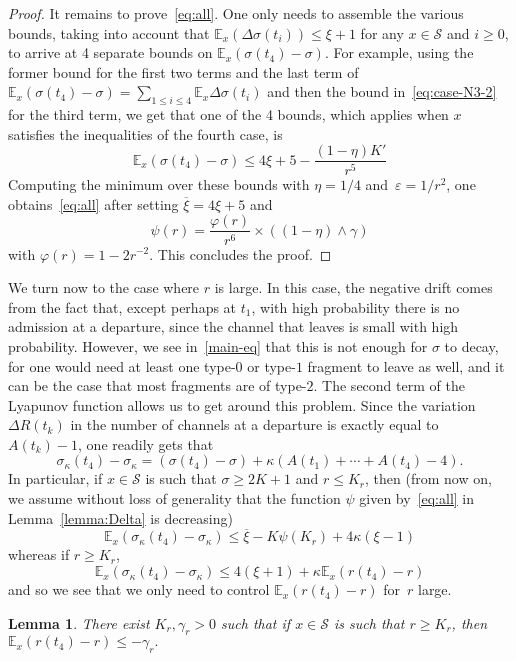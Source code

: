 \documentclass{amsart}
\def\E{\mathbb{E}}
\def\Scal{\mathcal{S}}
\newtheorem{lemma}{Lemma}
\begin{document}
\begin{proof}
It remains to prove~\eqref{eq:all}. One only needs to assemble the
various bounds, taking into account  that $\E_x(\Delta
\sigma (t_i)) \leq \xi + 1$ for any $x \in \Scal$ and $i \geq 0$, to
arrive at 4 separate bounds on $\E_x(\sigma(t_4)-\sigma)$.  For
example, using the former bound for the first two terms and the last
term of
$\E_x(\sigma(t_4)-\sigma) = \sum_{1 \leq i \leq 4} \E_x \Delta \sigma(t_i)$
and then the bound in~\eqref{eq:case-N3-2} for the third term, we
get that one of the 4 bounds, which applies when $x$ satisfies the
inequalities of the fourth case, is
$$
\E_x(\sigma(t_4)-\sigma) \leq  4\xi + 5 - \frac{(1-\eta)K'}{r^5}
$$
Computing the minimum over these bounds with $\eta=1/4$
and~$\varepsilon=1/r^{2}$, one obtains~\eqref{eq:all} after setting
$\overline{\xi} = 4 \xi +5$ and
    \[ \psi(r) = \frac{ \varphi(r)}{r^6} \times ((1-\eta) \wedge \gamma) \]
with $\varphi(r) = 1-2r^{-2}$. This concludes the proof.
\end{proof}
We turn now to  the case where $r$ is large.  In this case,  the
negative drift comes from the fact that, except  perhaps at $t_1$,
with high probability there  is no admission at a departure, since
the  channel that leaves is small with high  probability. However,
we see in~\eqref{main-eq} that this  is not enough for  $\sigma$ to
decay, for one  would need at least one type-$0$ or type-$1$
fragment to leave as well, and it can be the case that most
fragments are of type-$2$. The second term of the Lyapunov function
allows us to get around this  problem.  Since  the  variation
$\Delta R(t_k)$  in  the number  of  channels at  a departure is
exactly equal to $A(t_k) - 1$, one readily gets that
\[ \sigma_\kappa (t_4) - \sigma_\kappa = (\sigma(t_4) - \sigma) +
\kappa (A(t_1)  + \cdots + A(t_4) -  4). \] In particular,  if $x \in \Scal$  is such that
$\sigma  \geq 2K+1$  and $r  \leq  K_r$, then  (from now  on,  we assume  without loss  of
generality that the function  $\psi$ given by~\eqref{eq:all} in Lemma~\ref{lemma:Delta} is
decreasing)
\[ \E_x(\sigma_\kappa(t_4) - \sigma_\kappa)
\leq \overline{\xi} - K \psi(K_r) + 4 \kappa (\xi - 1)
\] whereas if $r \geq K_r$,
\[ \E_x(\sigma_\kappa(t_4) - \sigma_\kappa) \leq 4 (\xi
 + 1) + \kappa \E_x(r(t_4) - r) \] and so we see
that we only need to control $\E_x(r(t_4) - r)$ for~$r$ large.
\begin{lemma} \label{lemma:ell}
There exist $K_r, \gamma_r > 0$ such that if $x \in \Scal$ is such that $r \geq K_r$, then
 $ \E_x(r(t_4) - r) \leq -\gamma_r. $
\end{lemma}
\end{document}

